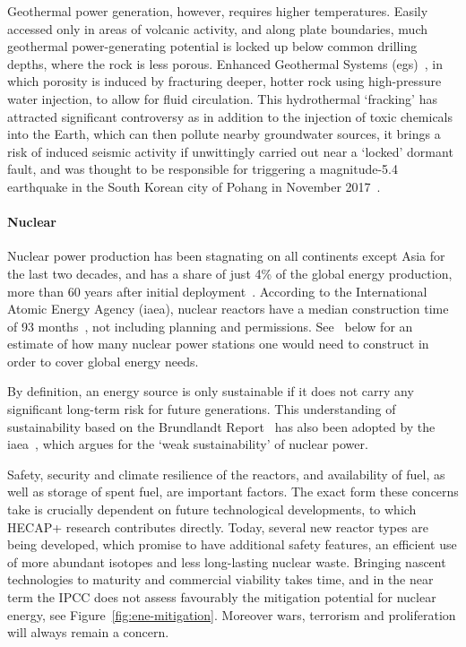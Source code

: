 \documentclass[../SustainableHEP.tex]{subfiles}
\begin{document}
Geothermal power generation, however, requires higher temperatures.  Easily accessed only in areas of volcanic activity, and along plate boundaries, much geothermal power-generating potential is locked up below common drilling depths, where the rock is less porous.  Enhanced Geothermal Systems (\acrshort{egs})~\cite{IRENA2017}, in which porosity is induced by fracturing deeper, hotter rock using high-pressure water injection, to allow for fluid circulation.  This hydrothermal `fracking' has attracted significant controversy as in addition to the injection of toxic chemicals into the Earth, which can then pollute nearby groundwater sources, it brings a risk of induced seismic activity if unwittingly carried out near a `locked' dormant fault, and was thought to be responsible for triggering a magnitude-5.4 earthquake in the South Korean city of Pohang in November 2017~\cite{Kim2018,Grigoli2018}. 

\paragraph{Nuclear}

Nuclear power production has been stagnating on all continents except Asia for the last two decades, and has a share of just 4\% of the global energy production, more than 60 years after initial deployment~\cite{OWDnuclear}. According to the International Atomic Energy Agency (\acrshort{iaea}), nuclear reactors have a median construction time of 93 months~\cite{IAEANuclear}, not including planning and permissions.  See~  below for an estimate of how many nuclear power stations one would need to construct in order to cover global energy needs. 
 
By definition, an energy source is only sustainable if it does not carry any significant long-term risk for future generations. This understanding of sustainability based on the Brundlandt Report~\cite{Brundtland} has also been adopted by the \acrshort{iaea}~\cite{IAEA}, which argues for the `weak sustainability' of nuclear power.

Safety, security and climate resilience of the reactors, and availability of fuel, as well as storage of spent fuel, are important factors.
The exact form these concerns take is crucially dependent on future technological developments, to which HECAP+ research contributes directly. Today, several new reactor types are being developed, which promise to have additional safety features, an efficient use of more abundant isotopes and less long-lasting nuclear waste.  Bringing nascent technologies to maturity and commercial viability takes time, and in the near term the IPCC does not assess favourably the mitigation potential for nuclear energy, see Figure~\ref{fig:ene-mitigation}.  Moreover wars, terrorism and proliferation will always remain a concern.
\end{document}
